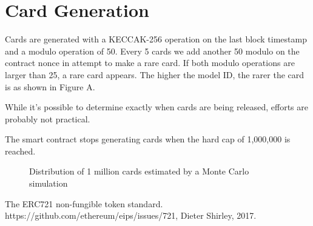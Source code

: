 \documentclass[11pt,twocolumn]{article}
\begin{document}
\section{Card Generation}
Cards are generated with a KECCAK-256 operation on the last block timestamp and a modulo operation of 50. Every 5 cards we add another 50 modulo on the contract nonce in attempt to make a rare card. If both modulo operations are larger than 25, a rare card appears. The higher the model ID, the rarer the card is as shown in Figure A.

While it's possible to determine exactly when cards are being released, efforts are probably not practical. 

The smart contract stops generating cards when the hard cap of 1,000,000 is reached.
\begin{figure}[!htb]
\centering 
    
\caption{Distribution of 1 million cards estimated by a Monte Carlo simulation} \label{fig:A}
\end{figure}


\onecolumn

\begin{thebibliography}{1}

         The ERC721 non-fungible token standard. https://github.com/ethereum/eips/issues/721, Dieter Shirley, 2017.
      
        \end{thebibliography}
\end{document}
